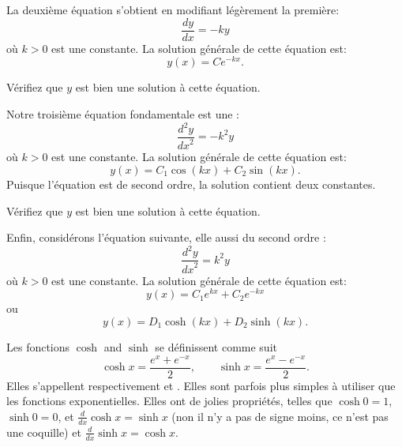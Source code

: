 \medskip

La deuxième équation s'obtient en modifiant légèrement
 la première: 
\begin{equation*}
\frac{dy}{dx} = -k y 
\end{equation*}
où $k > 0$ est une constante.
La solution générale de cette équation est: 
\begin{equation*}
y(x) = C e^{-kx} .
\end{equation*}

\begin{exercise}
Vérifiez que $y$ est bien une solution à cette équation.
\end{exercise}

Notre troisième équation fondamentale est une 
\emph{}: 
\begin{equation*}
\frac{d^2y}{{dx}^2} = -k^2 y 
\end{equation*}
où $k > 0$ est une constante.
La solution générale de cette équation est: 
\begin{equation*}
y(x) = C_1 \cos(kx) + C_2 \sin(kx) .
\end{equation*}
Puisque l'équation est de second ordre, la solution contient deux constantes.

\begin{exercise}
	Vérifiez que $y$ est bien une solution à cette équation.
\end{exercise}

Enfin, considérons l'équation suivante, elle aussi du second ordre : 
\begin{equation*}
	\frac{d^2y}{{dx}^2} = k^2 y 
\end{equation*}
où $k > 0$ est une constante.
La solution générale de cette équation est: 
\begin{equation*}
	y(x) = C_1 e^{kx} + C_2 e^{-kx} 
\end{equation*}
ou
\begin{equation*}
	y(x) = D_1 \cosh(kx) + D_2 \sinh(kx) .
\end{equation*}

Les fonctions $\cosh$ and $\sinh$ se définissent comme suit
\begin{equation*}
	\cosh x = \frac{e^{x} + e^{-x}}{2} , \qquad
	\sinh x = \frac{e^{x} - e^{-x}}{2} .
\end{equation*}
Elles s'appellent respectivement 
\emph{}
et
\emph{}.
Elles sont parfois plus simples à utiliser que les fonctions exponentielles.  Elles ont de jolies propriétés, telles que
$\cosh 0 = 1$, $\sinh 0 = 0$, et $\frac{d}{dx} \cosh x = \sinh x$ (non il n'y a pas de signe moins, ce n'est pas une coquille)
et $\frac{d}{dx} \sinh x = \cosh x$.

